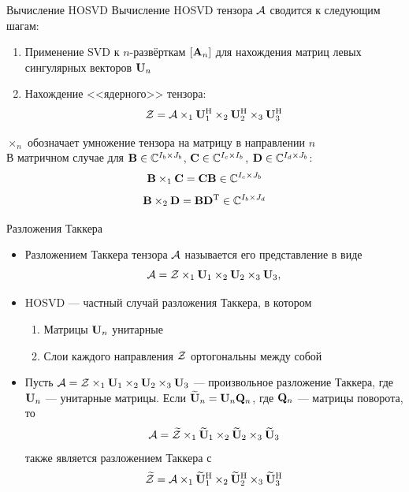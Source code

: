 \documentclass[pdf, unicode, 10pt, notheorems, handout]{beamer}
\newcommand{\Tp}{\mathrm{T}}
\newcommand{\Hp}{\mathrm{H}}
\begin{document}
\begin{frame}{Вычисление HOSVD}
  Вычисление HOSVD тензора $\mathcal{A}$ сводится к следующим шагам: \medskip

  \begin{enumerate}
    \item Применение SVD к $n$-развёрткам $[\mathbf{A}_n]$ для нахождения
      матриц левых сингулярных векторов $\mathbf{U}_n$ \smallskip
    \item Нахождение <<ядерного>> тензора:
      \[
        \calZ = \calA \times_1 \bfU_1^{\Hp} \times_2 \bfU_2^{\Hp}
        \times_3 \bfU_3^{\Hp}
      \]
  \end{enumerate} \medskip

  $\times_n$ обозначает умножение тензора на матрицу в направлении
  $n$\\
  В матричном случае для $\mathbf{B} \in \mathbb{C}^{I_b\times J_b}$, $\mathbf{C} \in
  \mathbb{C}^{I_c\times I_b}$, $\mathbf{D} \in \mathbb{C}^{I_d\times J_b}$:
  \[
    \mathbf{B} \times_1 \mathbf{C} = \mathbf{C} \mathbf{B} \in \mathbb{C}^{I_c \times J_b}
  \]
  \[
    \bfB \times_2 \bfD = \bfB \bfD^{\Tp} \in \bbC^{I_b \times J_d}
  \]
\end{frame}

\begin{frame}{Разложения Таккера}
  \begin{itemize}
    \item Разложением Таккера тензора $\mathcal{A}$ называется его
      представление в виде
      \[
        \mathcal{A} = \mathcal{Z} \times_1 \mathbf{U}_1 \times_2 \mathbf{U}_2 \times_3 \mathbf{U}_3,
      \]\smallskip

    \item HOSVD --- частный случай разложения Таккера, в котором
      \begin{enumerate}
        \item Матрицы $\mathbf{U}_n$ унитарные
        \item Слои каждого направления $\mathcal{Z}$ ортогональны между собой
      \end{enumerate}\smallskip

    \item Пусть $\mathcal{A} = \mathcal{Z} \times_1 \mathbf{U}_1 \times_2 \mathbf{U}_2
      \times_3 \mathbf{U}_3$ --- произвольное разложение Таккера, где $\mathbf{U}_n$
      --- унитарные матрицы. Если $\widetilde{\mathbf{U}}_n = \mathbf{U}_n \mathbf{Q}_n$, где
      $\mathbf{Q}_n$ --- матрицы поворота, то
      \[
        \mathcal{A} = \widetilde{\mathcal{Z}} \times_1 \widetilde{\mathbf{U}}_1
        \times_2 \widetilde{\mathbf{U}}_2 \times_3 \widetilde{\mathbf{U}}_3
      \]
      также является разложением Таккера с
      \[
        \widetilde{\calZ} = \calA \times_1 \widetilde{\bfU}_1^{\Hp} \times_2
        \widetilde{\bfU}_2^{\Hp} \times_3 \widetilde{\bfU}_3^{\Hp}
      \]

  \end{itemize}
\end{frame}
\end{document}
